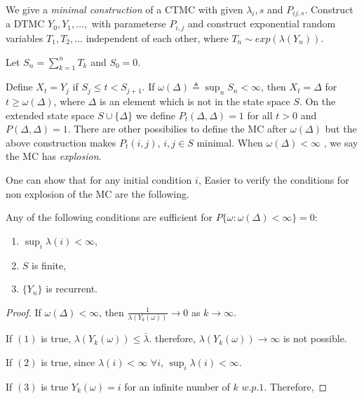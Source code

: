 \documentclass[all-lectures.tex]{subfiles}
\begin{document}
We give a \textit{minimal construction} of a CTMC with given $\lambda_i, s$ and $P_{ij,s}$.
Construct a DTMC $Y_0, Y_1, \dots, $ with parameterse $P_{i,j}$ and construct exponential random variables $T_1, T_2, \dots$ independent of each other, where $T_n \sim exp(\lambda(Y_n))$.

Let $S_n = \sum_{k=1}^{n} T_k$ and $S_0 = 0$.

Define $X_t = Y_j$ if $S_j \le t < S_{j+1}$.
If $\omega(\Delta) \triangleq \sup_n S_n < \infty$, then $X_t = \Delta$ for $t \ge \omega(\Delta)$,
where $\Delta$ is an element which is not in the state space $S$.  
On the extended state space $S \cup \{\Delta\}$ we define $P_t(\Delta, \Delta) =1$ for all $t>0$ and $P(\Delta, \Delta) =1$.
There are other possibilies to define the MC after $\omega(\Delta)$ but the above construction makes $P_t(i,j)$, $i,j \in S$ minimal. When  $\omega(\Delta) < \infty$ , we say the MC has \textit{explosion}.

One can show that for any initial condition $i$,
Easier to verify the conditions for non explosion of the MC are the following.

\begin{lem}
Any of the following conditions are sufficient for $P\{\omega:\omega(\Delta) < \infty \} = 0$:
\begin{enumerate}
	\item $\sup_i \lambda(i) < \infty$,
	\item $S$ is finite,
	\item $\{Y_n\}$ is recurrent.
\end{enumerate}
\end{lem}
\begin{proof}
	
\quad \quad  If $\omega(\Delta) < \infty$, then $\frac{1}{\lambda(Y_k(\omega))} \to 0$ as $k \to \infty$.

\quad \quad  If $(1)$ is true, $\lambda(Y_k(\omega)) \le \bar{\lambda}$.
therefore, $\lambda(Y_k(\omega)) \to \infty$ is not possible.

\quad \quad  If $(2)$ is true, since $\lambda(i) < \infty$ $\forall i$, \quad $\sup_i \lambda(i) < \infty$.

\quad \quad   If $(3)$ is true $Y_k(\omega) = i$ for an infinite number of $k$ $w.p. 1$.
Therefore,
\end{proof}
\end{document}
